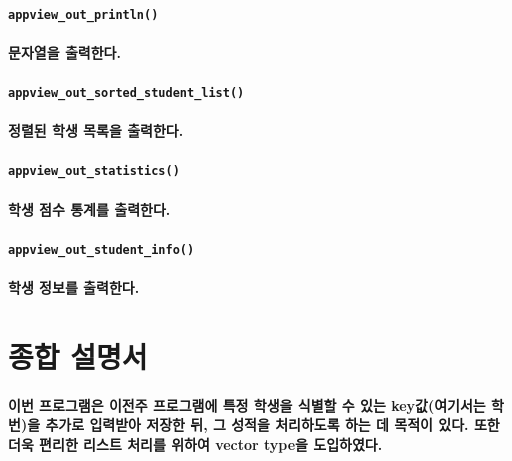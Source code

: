 \documentclass[UTF8]{report}
\begin{document}
            \paragraph{\texttt{appview\_out\_println()}}
            \paragraph{%
                \normalfont 문자열을 출력한다.
            }

            \paragraph{\texttt{appview\_out\_sorted\_student\_list()}}
            \paragraph{%
                \normalfont 정렬된 학생 목록을 출력한다.
            }

            \paragraph{\texttt{appview\_out\_statistics()}}
            \paragraph{%
                \normalfont 학생 점수 통계를 출력한다.
            }

            \paragraph{\texttt{appview\_out\_student\_info()}}
            \paragraph{%
                \normalfont 학생 정보를 출력한다.
            }

        \section{종합 설명서}

            \paragraph{%
                \normalfont  이번 프로그램은 이전주 프로그램에 특정 학생을 식별할 수 있는 key값(여기서는 학번)을 추가로 입력받아 저장한 뒤, 그 성적을 처리하도록 하는 데 목적이 있다. 또한 더욱 편리한 리스트 처리를 위하여 vector type을 도입하였다.
            }
            
\end{document}
